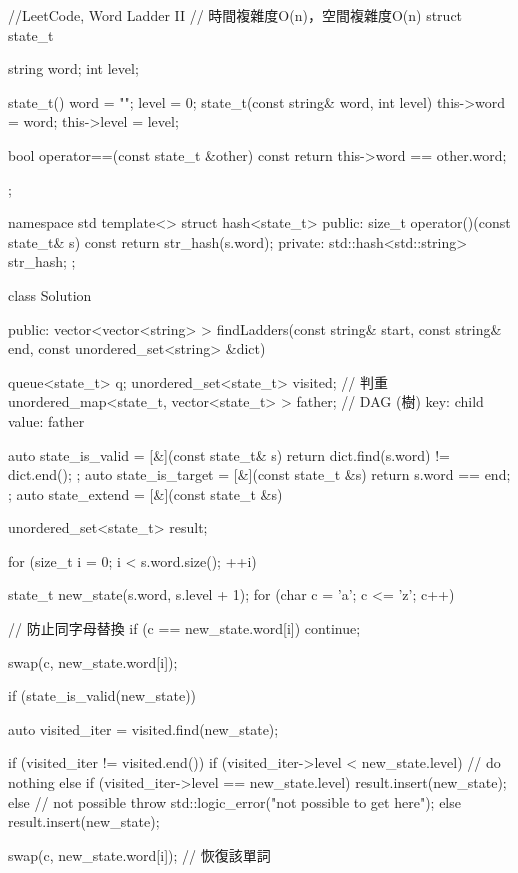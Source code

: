\begin{Code}
//LeetCode, Word Ladder II
// 時間複雜度O(n)，空間複雜度O(n)
struct state_t {
    string word;
    int level;

    state_t() { word = ""; level = 0; }
    state_t(const string& word, int level) {
        this->word = word;
        this->level = level;
    }

    bool operator==(const state_t &other) const {
        return this->word == other.word;
    }
};

namespace std {
    template<> struct hash<state_t> {
    public:
        size_t operator()(const state_t& s) const {
            return str_hash(s.word);
        }
    private:
        std::hash<std::string> str_hash;
    };
}


class Solution {
public:
    vector<vector<string> > findLadders(const string& start,
        const string& end, const unordered_set<string> &dict) {
        queue<state_t> q;
        unordered_set<state_t> visited; // 判重
        unordered_map<state_t, vector<state_t> > father; // DAG (樹) key: child value: father

        auto state_is_valid = [&](const state_t& s) {
            return dict.find(s.word) != dict.end();
        };
        auto state_is_target = [&](const state_t &s) {return s.word == end; };
        auto state_extend = [&](const state_t &s) {
            unordered_set<state_t> result;

            for (size_t i = 0; i < s.word.size(); ++i) {
                state_t new_state(s.word, s.level + 1);
                for (char c = 'a'; c <= 'z'; c++) {
                    // 防止同字母替換
                    if (c == new_state.word[i]) continue;

                    swap(c, new_state.word[i]);

                    if (state_is_valid(new_state)) {
                        auto visited_iter = visited.find(new_state);

                        if (visited_iter != visited.end()) {
                            if (visited_iter->level < new_state.level) {
                                // do nothing
                            } else if (visited_iter->level == new_state.level) {
                                result.insert(new_state);
                            } else { // not possible
                                throw std::logic_error("not possible to get here");
                            }
                        } else {
                            result.insert(new_state);
                        }
                    }
                    swap(c, new_state.word[i]); // 恢復該單詞
                }
            }

}}}
\end{Code}
